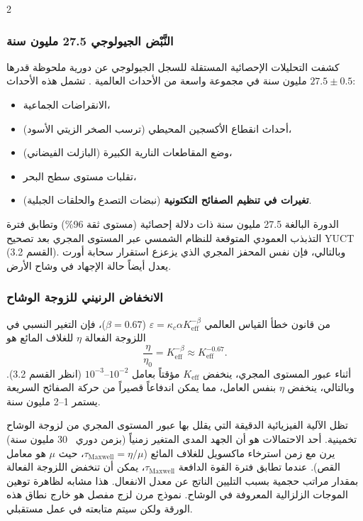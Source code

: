 \documentclass[11pt,a4paper]{article}
\begin{document}
\begin{multicols}{2}
		\subsubsection{النَّبْض الجيولوجي 27.5 مليون سنة}
		كشفت التحليلات الإحصائية المستقلة للسجل الجيولوجي عن دورية ملحوظة قدرها \(27.5 \pm 0.5\) مليون سنة في مجموعة واسعة من الأحداث العالمية \cite{Rampino2021,Rampino2023}. تشمل هذه الأحداث:
		\begin{itemize}
			\item الانقراضات الجماعية،
			\item أحداث انقطاع الأكسجين المحيطي (ترسب الصخر الزيتي الأسود)،
			\item وضع المقاطعات النارية الكبيرة (البازلت الفيضاني)،
			\item تقلبات مستوى سطح البحر،
			\item \textbf{تغيرات في تنظيم الصفائح التكتونية} (نبضات التصدع والحلقات الجبلية).
		\end{itemize}
		الدورة البالغة 27.5 مليون سنة ذات دلالة إحصائية (مستوى ثقة 96\%) وتطابق فترة التذبذب العمودي المتوقعة للنظام الشمسي عبر المستوى المجري بعد تصحيح YUCT (القسم 3.2). وبالتالي، فإن نفس المحفز المجري الذي يزعزع استقرار سحابة أورت يعدل أيضاً حالة الإجهاد في وشاح الأرض.
		
		\subsubsection{الانخفاض الرنيني للزوجة الوشاح}
		من قانون خطأ القياس العالمي \(\varepsilon = \kappa_c \alpha K_{\mathrm{eff}}^{-\beta}\) (\(\beta=0.67\))، فإن التغير النسبي في اللزوجة الفعالة \(\eta\) للغلاف المائع هو
		\[
		\frac{\eta}{\eta_0} = K_{\mathrm{eff}}^{-\beta} \approx K_{\mathrm{eff}}^{-0.67}.
		\]
		أثناء عبور المستوى المجري، ينخفض \(K_{\mathrm{eff}}\) مؤقتاً بعامل \(10^{-2}\)–\(10^{-3}\) (انظر القسم 3.2). وبالتالي، ينخفض \(\eta\) بنفس العامل، مما يمكن اندفاعاً قصيراً من حركة الصفائح السريعة يستمر 1–2 مليون سنة.
		
		تظل الآلية الفيزيائية الدقيقة التي يقلل بها عبور المستوى المجري من لزوجة الوشاح تخمينية. أحد الاحتمالات هو أن الجهد المدى المتغير زمنياً (بزمن دوري ~30 مليون سنة) يرن مع زمن استرخاء ماكسويل للغلاف المائع (\(\tau_{\mathrm{Maxwell}} = \eta/\mu\)، حيث \(\mu\) هو معامل القص). عندما تطابق فترة القوة الدافعة \(\tau_{\mathrm{Maxwell}}\)، يمكن أن تنخفض اللزوجة الفعالة بمقدار مراتب حجمية بسبب التليين الناتج عن معدل الانفعال. هذا مشابه لظاهرة توهين الموجات الزلزالية المعروفة في الوشاح. نموذج مرن لزج مفصل هو خارج نطاق هذه الورقة ولكن سيتم متابعته في عمل مستقبلي.
		

\end{multicols}
\end{document}
